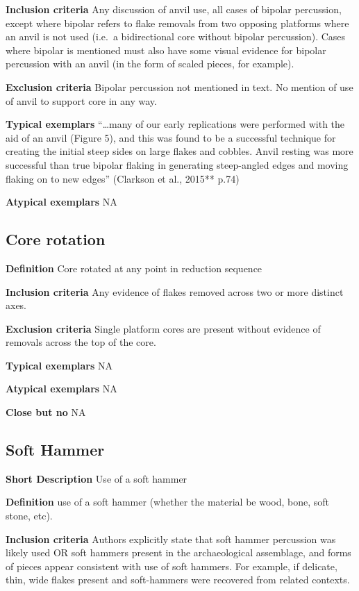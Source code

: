 \documentclass[
]{article}
\begin{document}
\textbf{Inclusion criteria} Any discussion of anvil use, all cases of
bipolar percussion, except where bipolar refers to flake removals from
two opposing platforms where an anvil is not used (i.e.~a bidirectional
core without bipolar percussion). Cases where bipolar is mentioned must
also have some visual evidence for bipolar percussion with an anvil (in
the form of scaled pieces, for example).

\textbf{Exclusion criteria} Bipolar percussion not mentioned in text. No
mention of use of anvil to support core in any way.

\textbf{Typical exemplars} ``\ldots many of our early replications were
performed with the aid of an anvil (Figure 5), and this was found to be
a successful technique for creating the initial steep sides on large
flakes and cobbles. Anvil resting was more successful than true bipolar
flaking in generating steep-angled edges and moving flaking on to new
edges'' (Clarkson et al., 2015** p.74)

\textbf{Atypical exemplars} NA

\hypertarget{core-rotation}{%
\subsection{Core rotation}\label{core-rotation}}

\textbf{Definition} Core rotated at any point in reduction sequence

\textbf{Inclusion criteria} Any evidence of flakes removed across two or
more distinct axes.

\textbf{Exclusion criteria} Single platform cores are present without
evidence of removals across the top of the core.

\textbf{Typical exemplars} NA

\textbf{Atypical exemplars} NA

\textbf{Close but no} NA

\hypertarget{soft-hammer}{%
\subsection{Soft Hammer}\label{soft-hammer}}

\textbf{Short Description} Use of a soft hammer

\textbf{Definition} use of a soft hammer (whether the material be wood,
bone, soft stone, etc).

\textbf{Inclusion criteria} Authors explicitly state that soft hammer
percussion was likely used OR soft hammers present in the archaeological
assemblage, and forms of pieces appear consistent with use of soft
hammers. For example, if delicate, thin, wide flakes present and
soft-hammers were recovered from related contexts.
\end{document}
